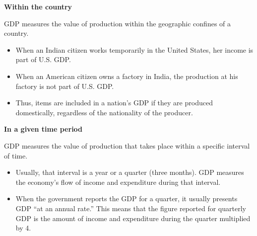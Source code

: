 \documentclass[shownotes,11pt, aspectratio=169]{beamer}
\begin{document}
\begin{frame}
\textbf{Within the country}
\\

\vspace{3mm}

GDP measures the value of production within the geographic confines of a country.
\begin{itemize}
\item When an Indian citizen works temporarily in the United States, her income is part of U.S. GDP. 
\item When an American citizen owns a factory in India, the production at his factory is not part of U.S. GDP. 
\item Thus, items are included in a nation's GDP if they are produced domestically, regardless
of the nationality of the producer.
\end{itemize}
\end{frame}

\begin{frame}
\textbf{In a given time period}\\
\vspace{3mm}

GDP measures the value of production that takes place within a specific interval
of time. 
\begin{itemize}
\item Usually, that interval is a year or a quarter (three months). GDP measures
the economy's flow of income and expenditure during that interval.
\item When the government reports the GDP for a quarter, it usually presents GDP
``at an annual rate.'' This means that the figure reported for quarterly GDP is the
amount of income and expenditure during the quarter multiplied by 4. 
\end{itemize}
\end{frame}
\end{document}
